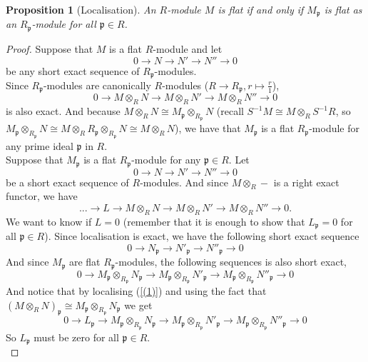 \documentclass{article}
\theoremstyle{plain}
\newtheorem{proposition}[theorem]{Proposition}
\theoremstyle{definition}
\begin{document}
\begin{proposition}[Localisation]
\label{flatness_at_all_localizations}
    An $R$-module $M$ is flat if and only if $M_\mathfrak{p}$ is flat as an $R_\mathfrak{p}$-module for all $\mathfrak{p}\in R$.
\end{proposition}
\begin{proof}
    Suppose that $M$ is a flat $R$-module and let 
    $$0\rightarrow N\rightarrow N'\rightarrow N''\rightarrow 0$$ 
    be any short exact sequence of $R_{\mathfrak{p}}$-modules.\\
    Since $R_{\mathfrak{p}}$-modules are canonically $R$-modules ($R\rightarrow R_{\mathfrak{p}}, r\mapsto \frac{r}{1}$), 
    $$0\rightarrow M\otimes_R N\rightarrow M\otimes_R N'\rightarrow M\otimes_R N''\rightarrow 0 $$
    is also exact.
    And because $M\otimes_R N \cong M_{\mathfrak{p}}\otimes_{R_{\mathfrak{p}}}N$ (recall $S^{-1}M\cong M\otimes_RS^{-1}R$, so $M_{\mathfrak{p}}\otimes_{R_{\mathfrak{p}}}N\cong M\otimes_R R_{\mathfrak{p}}\otimes_{R_{\mathfrak{p}}} N\cong M\otimes_R N$), we have that $M_{\mathfrak{p}}$ is a flat $R_{\mathfrak{p}}$-module for any prime ideal $\mathfrak{p}$ in $R$.\\
    Suppose that $M_{\mathfrak{p}}$ is a flat $R_{\mathfrak{p}}$-module for any $\mathfrak{p}\in R$. Let 
    $$0\rightarrow N\rightarrow N'\rightarrow N''\rightarrow 0$$ 
    be a short exact sequence of $R$-modules. And since $M\otimes_R -$ is a right exact functor, we have
    \begin{equation}
    \label{(1)}
        ...\rightarrow L \rightarrow M\otimes_RN\rightarrow M\otimes_RN'\rightarrow M\otimes_RN''\rightarrow 0.
    \end{equation}
    We want to know if $L=0$ (remember that it is enough to show that $L_{\mathfrak{p}}=0$ for all $\mathfrak{p}\in R$).
    Since localisation is exact, we have the following short exact sequence
    $$0\rightarrow N_{\mathfrak{p}}\rightarrow N'_{\mathfrak{p}}\rightarrow N''_{\mathfrak{p}}\rightarrow 0$$
    And since $M_{\mathfrak{p}}$ are flat $R_{\mathfrak{p}}$-modules, the following sequences is also short exact,
    $$0\rightarrow M_{\mathfrak{p}}\otimes_{R_{\mathfrak{p}}} N_{\mathfrak{p}}\rightarrow M_{\mathfrak{p}}\otimes_{R_{\mathfrak{p}}}N'_{\mathfrak{p}}\rightarrow M_{\mathfrak{p}}\otimes_{R_{\mathfrak{p}}}N''_{\mathfrak{p}}\rightarrow 0$$
    And notice that by localising (\ref{(1)}) and using the fact that $(M\otimes_RN)_{\mathfrak{p}} \cong M_{\mathfrak{p}}\otimes_{R_{\mathfrak{p}}}N_{\mathfrak{p}}$ we get
    $$0\rightarrow L_{\mathfrak{p}}\rightarrow M_{\mathfrak{p}}\otimes_{R_{\mathfrak{p}}} N_{\mathfrak{p}}\rightarrow M_{\mathfrak{p}}\otimes_{R_{\mathfrak{p}}}N'_{\mathfrak{p}}\rightarrow M_{\mathfrak{p}}\otimes_{R_{\mathfrak{p}}}N''_{\mathfrak{p}}\rightarrow 0$$
    So $L_{\mathfrak{p}}$ must be zero for all $\mathfrak{p}\in R$.\\
\end{proof}
\end{document}
